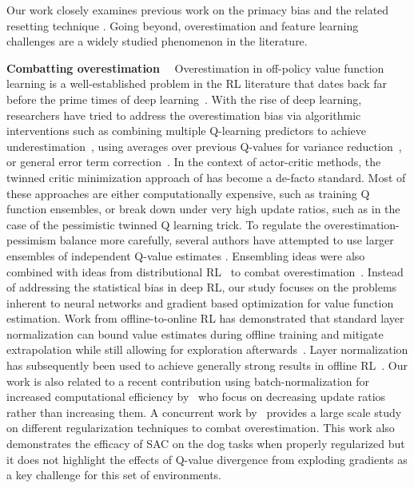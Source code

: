Our work closely examines previous work on the primacy bias and the related resetting technique \parencite{anderson1992qlearning,nikishin2022primacy,doro2023barrier,schwarzer2023bigger}.
Going beyond, overestimation and feature learning challenges are a widely studied phenomenon in the literature.

{\bf Combatting overestimation}~~
Overestimation in off-policy value function learning is a well-established problem in the RL literature that dates back far before the prime times of deep learning~\parencite{thrun1993issues, precup2001off}. 
With the rise of deep learning, researchers have tried to address the overestimation bias via algorithmic interventions such as combining multiple Q-learning predictors to achieve underestimation~\parencite{hasselt2010double, hasselt2016deep, zongzhang2017weighted, lan2020maxmin}, using averages over previous Q-values for variance reduction~\parencite{anschel2017averaged}, or general error term correction~\parencite{donghun2013bias, fox2016taming}. In the context of actor-critic methods, the twinned critic minimization approach of \textcite{fujimoto2018addressing} has become a de-facto standard. 
Most of these approaches are either computationally expensive, such as training Q function ensembles, or break down under very high update ratios, such as in the case of the pessimistic twinned Q learning trick.
To regulate the overestimation-pessimism balance more carefully, several authors have attempted to use larger ensembles of independent Q-value estimates \parencite{lee2021sunrise,peer2021ensemble,chen2021randomized,hiraoka2022dropout}. Ensembling ideas were also combined with ideas from distributional RL~\parencite{bellemare2017distributional} to combat overestimation~\parencite{kuznetsov2020controlling}.  Instead of addressing the statistical bias in deep RL, our study focuses on the problems inherent to neural networks and gradient based optimization for value function estimation. Work from offline-to-online RL has demonstrated that standard layer normalization can bound value estimates during offline training and mitigate extrapolation while still allowing for exploration afterwards~\parencite{ball2023efficient}. Layer normalization has subsequently been used to achieve generally strong results in offline RL~\parencite{tarasov2023rebrac}. Our work is also related to a recent contribution using batch-normalization for increased computational efficiency by~\textcite{bhatt2024crossq} who focus on decreasing update ratios rather than increasing them. A concurrent work by~\textcite{nauman2024overestimation} provides a large scale study on different regularization techniques to combat overestimation. This work also demonstrates the efficacy of SAC on the dog tasks when properly regularized but it does not highlight the effects of Q-value divergence from exploding gradients as a key challenge for this set of environments.

